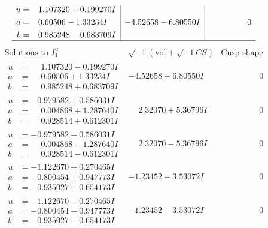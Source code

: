 \documentclass[1p]{elsarticle_modified}
\theoremstyle{definition}
\newcommand{\I}{\sqrt{-1}}
\begin{document}
$$\begin{array}{c|c|c}
\begin{aligned}
u &= \phantom{-}1.107320 + 0.199270 I \\
a &= \phantom{-}0.60506 - 1.33234 I \\
b &= \phantom{-}0.985248 - 0.683709 I\end{aligned}
 & -4.52658 - 6.80550 I & \phantom{-0.000000 } 0\\
 \hline 
 \end{array}$$\newpage$$\begin{array}{c|c|c}  
\text{Solutions to }I^u_{1}& \I (\text{vol} + \sqrt{-1}CS) & \text{Cusp shape}\\
 \hline 
\begin{aligned}
u &= \phantom{-}1.107320 - 0.199270 I \\
a &= \phantom{-}0.60506 + 1.33234 I \\
b &= \phantom{-}0.985248 + 0.683709 I\end{aligned}
 & -4.52658 + 6.80550 I & \phantom{-0.000000 } 0 \\ \hline\begin{aligned}
u &= -0.979582 + 0.586031 I \\
a &= \phantom{-}0.004868 + 1.287640 I \\
b &= \phantom{-}0.928514 + 0.612301 I\end{aligned}
 & \phantom{-}2.32070 + 5.36796 I & \phantom{-0.000000 } 0 \\ \hline\begin{aligned}
u &= -0.979582 - 0.586031 I \\
a &= \phantom{-}0.004868 - 1.287640 I \\
b &= \phantom{-}0.928514 - 0.612301 I\end{aligned}
 & \phantom{-}2.32070 - 5.36796 I & \phantom{-0.000000 } 0 \\ \hline\begin{aligned}
u &= -1.122670 + 0.270465 I \\
a &= -0.800454 + 0.947773 I \\
b &= -0.935027 + 0.654173 I\end{aligned}
 & -1.23452 - 3.53072 I & \phantom{-0.000000 } 0 \\ \hline\begin{aligned}
u &= -1.122670 - 0.270465 I \\
a &= -0.800454 - 0.947773 I \\
b &= -0.935027 - 0.654173 I\end{aligned}
 & -1.23452 + 3.53072 I & \phantom{-0.000000 } 0 \\ \hline\begin{aligned}

\end{aligned}
\end{array}$$
\end{document}
